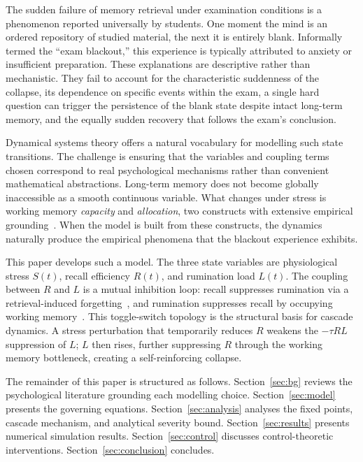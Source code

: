 The sudden failure of memory retrieval under examination conditions
is a phenomenon reported universally by students. One moment the
mind is an ordered repository of studied material, the next it is
entirely blank. Informally termed the ``exam blackout,'' this
experience is typically attributed to anxiety or insufficient
preparation. These explanations are descriptive rather than
mechanistic. They fail to account for the characteristic suddenness
of the collapse, its dependence on specific events within the
exam, a single hard question can trigger the persistence of
the blank state despite intact long-term memory, and the equally
sudden recovery that follows the exam's conclusion.

Dynamical systems theory offers a natural vocabulary for modelling
such state transitions. The challenge is ensuring that the variables
and coupling terms chosen correspond to real psychological mechanisms
rather than convenient mathematical abstractions. Long-term memory
does not become globally inaccessible as a smooth continuous
variable. What changes under stress is working memory
\emph{capacity} and \emph{allocation}, two constructs with
extensive empirical grounding~\cite{baddeley1986,eysenck2007}.
When the model is built from these constructs, the dynamics naturally 
produce the empirical phenomena that the blackout experience exhibits.

This paper develops such a model. The three state variables are
physiological stress $S(t)$, recall efficiency $R(t)$, and
rumination load $L(t)$. The coupling between $R$ and $L$ is a
mutual inhibition loop: recall suppresses rumination via a
retrieval-induced forgetting~\cite{anderson2003}, and rumination
suppresses recall by occupying working memory~\cite{eysenck2007}.
This toggle-switch topology is the structural basis for cascade
dynamics. A stress perturbation that temporarily reduces $R$
weakens the $-\tau RL$ suppression of $L$; $L$ then rises,
further suppressing $R$ through the working memory bottleneck,
creating a self-reinforcing collapse.

The remainder of this paper is structured as follows.
Section~\ref{sec:bg} reviews the psychological literature grounding
each modelling choice. Section~\ref{sec:model} presents the
governing equations. Section~\ref{sec:analysis} analyses the fixed
points, cascade mechanism, and analytical severity bound.
Section~\ref{sec:results} presents numerical simulation results.
Section~\ref{sec:control} discusses control-theoretic interventions.
Section~\ref{sec:conclusion} concludes.

